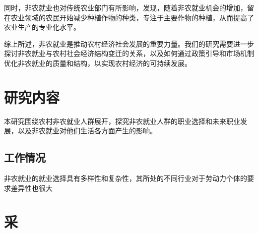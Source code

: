 \documentclass[12pt]{article}
\begin{document}
同时，非农就业也对传统农业部门有所影响，\cite{wang2017off}发现，随着非农就业机会的增加，留在农业领域的农民开始减少种植作物的种类，专注于主要作物的种植，从而提高了农业生产的专业化水平。

综上所述，非农就业是推动农村经济社会发展的重要力量。我们的研究需要进一步探讨非农就业与农村社会经济结构变迁的关系，以及如何通过政策引导和市场机制优化非农就业的质量和结构，以实现农村经济的可持续发展。

\section{研究内容}
本研究围绕农村非农就业人群展开，探究非农就业人群的职业选择和未来职业发展，以及非农就业对他们生活各方面产生的影响。
\subsection{工作情况}
非农就业的就业选择具有多样性和复杂性，其所处的不同行业对于劳动力个体的要求差异性也很大
\section{采}
\end{document}
